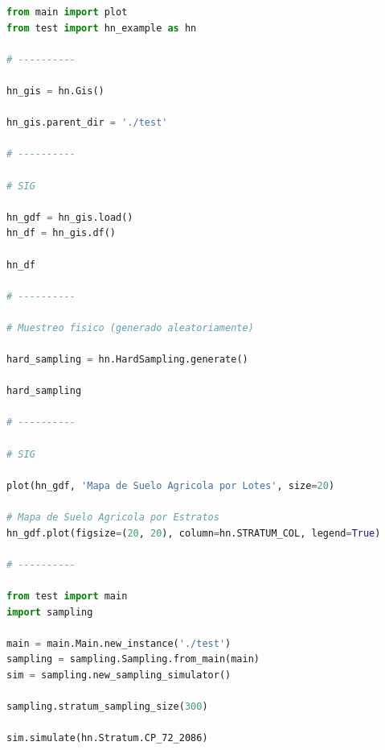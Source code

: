 \documentclass{article}
\begin{document}
\begin{lstlisting}[language=Python, caption=Introducción al enunciados del problema]
from main import plot
from test import hn_example as hn

# ----------

hn_gis = hn.Gis()

hn_gis.parent_dir = './test'

# ----------

# SIG

hn_gdf = hn_gis.load()
hn_df = hn_gis.df()

hn_df

# ----------

# Muestreo fisico (generado aleatoriamente)

hard_sampling = hn.HardSampling.generate()

hard_sampling

# ----------

# SIG

plot(hn_gdf, 'Mapa de Suelo Agricola por Lotes', size=20)

# Mapa de Suelo Agricola por Estratos
hn_gdf.plot(figsize=(20, 20), column=hn.STRATUM_COL, legend=True)

# ----------

from test import main
import sampling

main = main.Main.new_instance('./test')
sampling = sampling.Sampling.from_main(main)
sim = sampling.new_sampling_simulator()

sampling.stratum_sampling_size(300)

sim.simulate(hn.Stratum.CP_72_2086)
\end{lstlisting}
\end{document}
